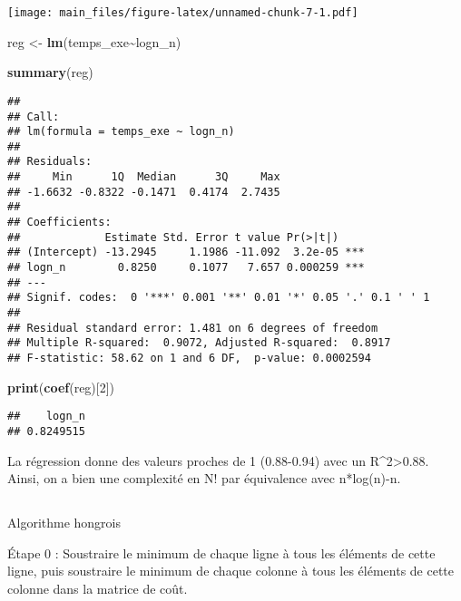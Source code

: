 \documentclass[
]{article}
\newenvironment{Shaded}{\begin{snugshade}}{\end{snugshade}}
\newcommand{\DecValTok}[1]{\textcolor[rgb]{0.00,0.00,0.81}{#1}}
\newcommand{\FunctionTok}[1]{\textcolor[rgb]{0.13,0.29,0.53}{\textbf{#1}}}
\newcommand{\NormalTok}[1]{#1}
\newcommand{\OtherTok}[1]{\textcolor[rgb]{0.56,0.35,0.01}{#1}}
\newcommand{\SpecialCharTok}[1]{\textcolor[rgb]{0.81,0.36,0.00}{\textbf{#1}}}
\begin{document}
\texttt{[image: main\_files/figure-latex/unnamed-chunk-7-1.pdf]}

\begin{Shaded}
\begin{Highlighting}[]
\NormalTok{reg }\OtherTok{\textless{}{-}} \FunctionTok{lm}\NormalTok{(temps\_exe}\SpecialCharTok{\textasciitilde{}}\NormalTok{logn\_n)}

\FunctionTok{summary}\NormalTok{(reg)}
\end{Highlighting}
\end{Shaded}

\begin{verbatim}
## 
## Call:
## lm(formula = temps_exe ~ logn_n)
## 
## Residuals:
##     Min      1Q  Median      3Q     Max 
## -1.6632 -0.8322 -0.1471  0.4174  2.7435 
## 
## Coefficients:
##             Estimate Std. Error t value Pr(>|t|)    
## (Intercept) -13.2945     1.1986 -11.092  3.2e-05 ***
## logn_n        0.8250     0.1077   7.657 0.000259 ***
## ---
## Signif. codes:  0 '***' 0.001 '**' 0.01 '*' 0.05 '.' 0.1 ' ' 1
## 
## Residual standard error: 1.481 on 6 degrees of freedom
## Multiple R-squared:  0.9072, Adjusted R-squared:  0.8917 
## F-statistic: 58.62 on 1 and 6 DF,  p-value: 0.0002594
\end{verbatim}

\begin{Shaded}
\begin{Highlighting}[]
\FunctionTok{print}\NormalTok{(}\FunctionTok{coef}\NormalTok{(reg)[}\DecValTok{2}\NormalTok{])}
\end{Highlighting}
\end{Shaded}

\begin{verbatim}
##    logn_n 
## 0.8249515
\end{verbatim}

La régression donne des valeurs proches de 1 (0.88-0.94) avec un
R\^{}2\textgreater0.88. Ainsi, on a bien une complexité en N! par
équivalence avec n*log(n)-n.~

\hypertarget{section-13}{%
\subsection{}\label{section-13}}

Algorithme hongrois

Étape 0 : Soustraire le minimum de chaque ligne à tous les éléments de
cette ligne, puis soustraire le minimum de chaque colonne à tous les
éléments de cette colonne dans la matrice de coût.
\end{document}
